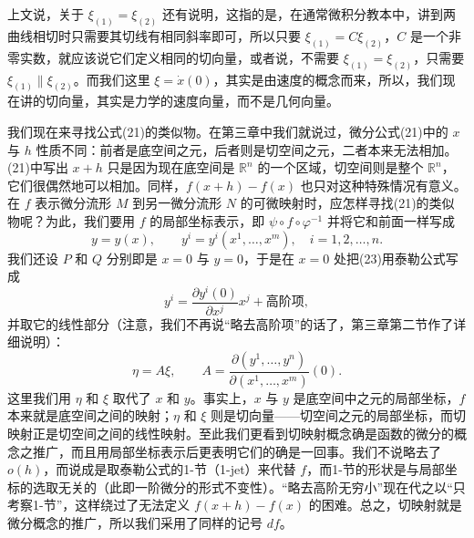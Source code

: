上文说，关于 $\xi_{(1)}=\xi_{(2)}$ 还有说明，这指的是，在通常微积分教本中，讲到两曲线相切时只需要其切线有相同斜率即可，所以只要 $\xi_{(1)}=C\xi_{(2)}$，$C$ 是一个非零实数，就应该说它们定义相同的切向量，或者说，不需要 $\xi_{(1)}=\xi_{(2)}$，只需要 $\xi_{(1)}\parallel\xi_{(2)}$。而我们这里 $\xi=\dot x(0)$，其实是由速度的概念而来，所以，我们现在讲的切向量，其实是力学的速度向量，而不是几何向量。

我们现在来寻找公式(21)的类似物。在第三章中我们就说过，微分公式(21)中的 $x$ 与 $h$ 性质不同：前者是底空间之元，后者则是切空间之元，二者本来无法相加。(21)中写出 $x+h$ 只是因为现在底空间是 $\mathbb R^n$ 的一个区域，切空间则是整个 $\mathbb R^n$，它们很偶然地可以相加。同样，$f(x+h)-f(x)$ 也只对这种特殊情况有意义。在 $f$ 表示微分流形 $M$ 到另一微分流形 $N$ 的可微映射时，应怎样寻找(21)的类似物呢？为此，我们要用 $f$ 的局部坐标表示，即 $\psi\circ f\circ\varphi^{-1}$ 并将它和前面一样写成
\begin{equation}
 y=y(x),\qquad y^i=y^i(x^1,\ldots,x^m),\quad i=1,2,\ldots,n.
 \tag{23}
\end{equation}
我们还设 $P$ 和 $Q$ 分别即是 $x=0$ 与 $y=0$，于是在 $x=0$ 处把(23)用泰勒公式写成
\[
 y^i=\frac{\partial y^i(0)}{\partial x^j}x^j+\text{高阶项},
\]
并取它的线性部分（注意，我们不再说“略去高阶项”的话了，第三章第二节作了详细说明）：
\[
 \eta=A\xi,
 \qquad
 A=\frac{\partial(y^1,\ldots,y^n)}{\partial(x^1,\ldots,x^m)}(0).
\]
这里我们用 $\eta$ 和 $\xi$ 取代了 $x$ 和 $y$。事实上，$x$ 与 $y$ 是底空间中之元的局部坐标，$f$ 本来就是底空间之间的映射；$\eta$ 和 $\xi$ 则是切向量——切空间之元的局部坐标，而切映射正是切空间之间的线性映射。至此我们更看到切映射概念确是函数的微分的概念之推广，而且用局部坐标表示后更表明它们的确是一回事。我们不说略去了 $o(h)$，而说成是取泰勒公式的1-节（1-jet）来代替 $f$，而1-节的形状是与局部坐标的选取无关的（此即一阶微分的形式不变性）。“略去高阶无穷小”现在代之以“只考察1-节”，这样绕过了无法定义 $f(x+h)-f(x)$ 的困难。总之，切映射就是微分概念的推广，所以我们采用了同样的记号 $df$。

